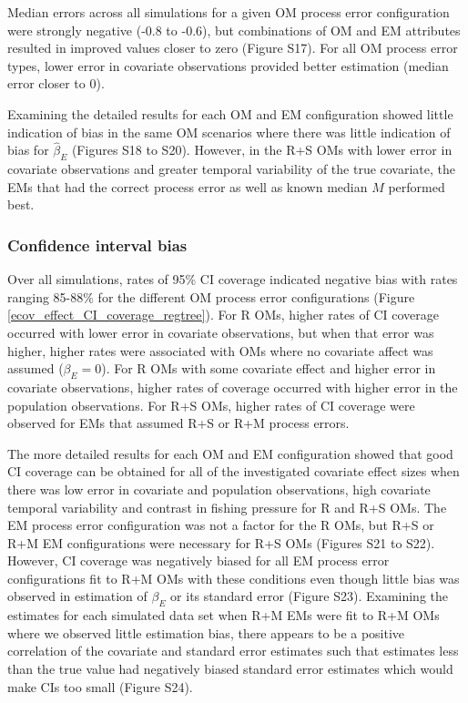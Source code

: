 \documentclass[
  12pt,
]{article}
\begin{document}
Median errors across all simulations for a given OM process error
configuration were strongly negative (-0.8 to -0.6), but combinations of
OM and EM attributes resulted in improved values closer to zero (Figure
S17). For all OM process error types, lower error in covariate
observations provided better estimation (median error closer to 0).

Examining the detailed results for each OM and EM configuration showed
little indication of bias in the same OM scenarios where there was
little indication of bias for \(\widehat \beta_E\) (Figures S18 to S20).
However, in the R+S OMs with lower error in covariate observations and
greater temporal variability of the true covariate, the EMs that had the
correct process error as well as known median \(M\) performed best.

\subsubsection*{Confidence interval
bias}\label{confidence-interval-bias-1}

Over all simulations, rates of 95\% CI coverage indicated negative bias
with rates ranging 85-88\% for the different OM process error
configurations (Figure \ref{ecov_effect_CI_coverage_regtree}). For R
OMs, higher rates of CI coverage occurred with lower error in covariate
observations, but when that error was higher, higher rates were
associated with OMs where no covariate affect was assumed
(\(\beta_E = 0\)). For R OMs with some covariate effect and higher error
in covariate observations, higher rates of coverage occurred with higher
error in the population observations. For R+S OMs, higher rates of CI
coverage were observed for EMs that assumed R+S or R+M process errors.

The more detailed results for each OM and EM configuration showed that
good CI coverage can be obtained for all of the investigated covariate
effect sizes when there was low error in covariate and population
observations, high covariate temporal variability and contrast in
fishing pressure for R and R+S OMs. The EM process error configuration
was not a factor for the R OMs, but R+S or R+M EM configurations were
necessary for R+S OMs (Figures S21 to S22). However, CI coverage was
negatively biased for all EM process error configurations fit to R+M OMs
with these conditions even though little bias was observed in estimation
of \(\beta_E\) or its standard error (Figure S23). Examining the
estimates for each simulated data set when R+M EMs were fit to R+M OMs
where we observed little estimation bias, there appears to be a positive
correlation of the covariate and standard error estimates such that
estimates less than the true value had negatively biased standard error
estimates which would make CIs too small (Figure S24).
\end{document}
